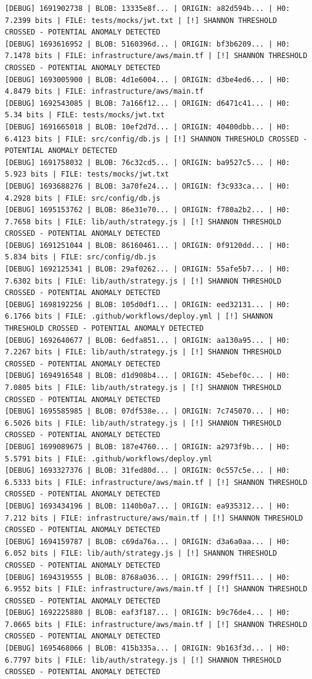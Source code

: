 \documentclass[12pt, a4paper, oneside]{report}
\begin{document}
\begin{lstlisting}[basicstyle=\tiny\ttfamily]
[DEBUG] 1691902738 | BLOB: 13335e8f... | ORIGIN: a82d594b... | H0: 7.2399 bits | FILE: tests/mocks/jwt.txt | [!] SHANNON THRESHOLD CROSSED - POTENTIAL ANOMALY DETECTED
[DEBUG] 1693616952 | BLOB: 5160396d... | ORIGIN: bf3b6209... | H0: 7.1478 bits | FILE: infrastructure/aws/main.tf | [!] SHANNON THRESHOLD CROSSED - POTENTIAL ANOMALY DETECTED
[DEBUG] 1693005900 | BLOB: 4d1e6004... | ORIGIN: d3be4ed6... | H0: 4.8479 bits | FILE: infrastructure/aws/main.tf
[DEBUG] 1692543085 | BLOB: 7a166f12... | ORIGIN: d6471c41... | H0: 5.34 bits | FILE: tests/mocks/jwt.txt
[DEBUG] 1691665018 | BLOB: 10ef2d7d... | ORIGIN: 40400dbb... | H0: 6.4123 bits | FILE: src/config/db.js | [!] SHANNON THRESHOLD CROSSED - POTENTIAL ANOMALY DETECTED
[DEBUG] 1691758032 | BLOB: 76c32cd5... | ORIGIN: ba9527c5... | H0: 5.923 bits | FILE: tests/mocks/jwt.txt
[DEBUG] 1693688276 | BLOB: 3a70fe24... | ORIGIN: f3c933ca... | H0: 4.2928 bits | FILE: src/config/db.js
[DEBUG] 1695153762 | BLOB: 86e31e70... | ORIGIN: f780a2b2... | H0: 7.7658 bits | FILE: lib/auth/strategy.js | [!] SHANNON THRESHOLD CROSSED - POTENTIAL ANOMALY DETECTED
[DEBUG] 1691251044 | BLOB: 86160461... | ORIGIN: 0f9120dd... | H0: 5.834 bits | FILE: src/config/db.js
[DEBUG] 1692125341 | BLOB: 29af0262... | ORIGIN: 55afe5b7... | H0: 7.6302 bits | FILE: lib/auth/strategy.js | [!] SHANNON THRESHOLD CROSSED - POTENTIAL ANOMALY DETECTED
[DEBUG] 1698192256 | BLOB: 105d0df1... | ORIGIN: eed32131... | H0: 6.1766 bits | FILE: .github/workflows/deploy.yml | [!] SHANNON THRESHOLD CROSSED - POTENTIAL ANOMALY DETECTED
[DEBUG] 1692640677 | BLOB: 6edfa851... | ORIGIN: aa130a95... | H0: 7.2267 bits | FILE: lib/auth/strategy.js | [!] SHANNON THRESHOLD CROSSED - POTENTIAL ANOMALY DETECTED
[DEBUG] 1694916548 | BLOB: d1d908b4... | ORIGIN: 45ebef0c... | H0: 7.0805 bits | FILE: lib/auth/strategy.js | [!] SHANNON THRESHOLD CROSSED - POTENTIAL ANOMALY DETECTED
[DEBUG] 1695585985 | BLOB: 07df538e... | ORIGIN: 7c745070... | H0: 6.5026 bits | FILE: lib/auth/strategy.js | [!] SHANNON THRESHOLD CROSSED - POTENTIAL ANOMALY DETECTED
[DEBUG] 1699089675 | BLOB: 187e4760... | ORIGIN: a2973f9b... | H0: 5.5791 bits | FILE: .github/workflows/deploy.yml
[DEBUG] 1693327376 | BLOB: 31fed80d... | ORIGIN: 0c557c5e... | H0: 6.5333 bits | FILE: infrastructure/aws/main.tf | [!] SHANNON THRESHOLD CROSSED - POTENTIAL ANOMALY DETECTED
[DEBUG] 1693434196 | BLOB: 1140b0a7... | ORIGIN: ea935312... | H0: 7.212 bits | FILE: infrastructure/aws/main.tf | [!] SHANNON THRESHOLD CROSSED - POTENTIAL ANOMALY DETECTED
[DEBUG] 1694159787 | BLOB: c69da76a... | ORIGIN: d3a6a0aa... | H0: 6.052 bits | FILE: lib/auth/strategy.js | [!] SHANNON THRESHOLD CROSSED - POTENTIAL ANOMALY DETECTED
[DEBUG] 1694319555 | BLOB: 8768a036... | ORIGIN: 299ff511... | H0: 6.9552 bits | FILE: infrastructure/aws/main.tf | [!] SHANNON THRESHOLD CROSSED - POTENTIAL ANOMALY DETECTED
[DEBUG] 1692225880 | BLOB: eaf3f187... | ORIGIN: b9c76de4... | H0: 7.0665 bits | FILE: infrastructure/aws/main.tf | [!] SHANNON THRESHOLD CROSSED - POTENTIAL ANOMALY DETECTED
[DEBUG] 1695468066 | BLOB: 415b335a... | ORIGIN: 9b163f3d... | H0: 6.7797 bits | FILE: lib/auth/strategy.js | [!] SHANNON THRESHOLD CROSSED - POTENTIAL ANOMALY DETECTED
\end{lstlisting}
\end{document}
